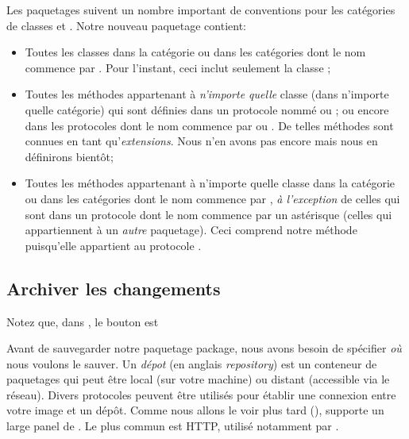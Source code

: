 \documentclass[a4paper,10pt,twoside]{book}
\begin{document}
Les paquetages \MC suivent un nombre important de conventions pour les
catégories de classes et . %
Notre nouveau paquetage  contient:

\begin{itemize}

\item Toutes les classes dans la catégorie  ou dans les
  catégories dont le nom commence par . 
Pour l'instant, ceci inclut seulement la classe
; 

\item Toutes les méthodes appartenant à \emph{n'importe quelle} classe
  (dans n'importe quelle catégorie) qui sont définies dans un
  protocole nommé  ou ; ou encore dans
  les protocoles dont le nom commence par   ou
  .
De telles méthodes sont connues en tant qu'\emph{extensions}. 
Nous n'en avons pas encore mais nous en définirons bientôt;

\item Toutes les méthodes appartenant à n'importe quelle classe dans
  la catégorie  ou dans les catégories dont le nom
  commence par , \emph{à l'exception} de celles 
qui sont dans un protocole dont le nom commence par un astérisque 
 \prot{*} (\ie celles qui appartiennent à un \emph{autre} paquetage).
Ceci comprend notre méthode  puisqu'elle appartient au
protocole .

\end{itemize}

\subsection{Archiver les changements}


Notez que, dans 
, le bouton  est 

Avant de sauvegarder notre paquetage
  package, nous avons besoin de spécifier \emph{où} nous
 voulons le sauver. Un \emph{dépot} (en anglais \emph{repository}) est
 un conteneur de paquetages qui peut être local (sur votre machine) ou
 distant (accessible via le réseau).
Divers protocoles peuvent être utilisés pour établir une connexion
entre votre image \pharo et un dépôt. Comme nous allons le voir plus
tard (), \MC supporte un large panel de
. Le plus commun est HTTP, utilisé
notamment par \sqsrc. 
\end{document}
